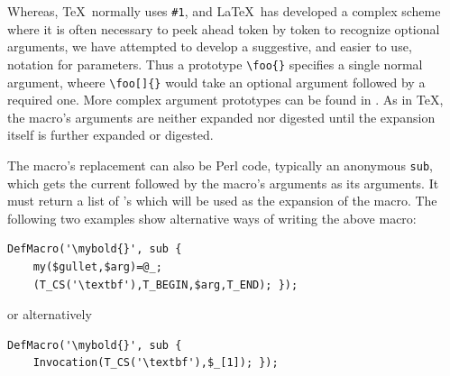 \documentclass{book}
\begin{document}
Whereas, \TeX\ normally uses \verb|#1|, and \LaTeX\ has developed
a complex scheme where it is often necessary to peek ahead token
by token to recognize optional arguments, we have attempted
to develop a suggestive, and easier to use, notation for parameters.
Thus a prototype \verb|\foo{}| specifies a single normal argument,
wheere \verb|\foo[]{}| would take an optional argument followed
by a required one.  More complex argument prototypes can be
found in .
As in \TeX, the macro's arguments are neither expanded
nor digested until the expansion itself is further
expanded or digested.

The macro's replacement can also be Perl code, typically an
anonymous \texttt{sub}, which gets the current 
followed by the macro's arguments as its arguments.  It must
return a list of 's which will be used as the
expansion of the macro.  The following two examples show
alternative ways of writing the above macro:
\begin{lstlisting}[style=latexml]
  DefMacro('\mybold{}', sub {
    my($gullet,$arg)=@_;
    (T_CS('\textbf'),T_BEGIN,$arg,T_END); });
\end{lstlisting}
or alternatively
\begin{lstlisting}[style=latexml]
  DefMacro('\mybold{}', sub {
    Invocation(T_CS('\textbf'),$_[1]); });
\end{lstlisting}
\end{document}
